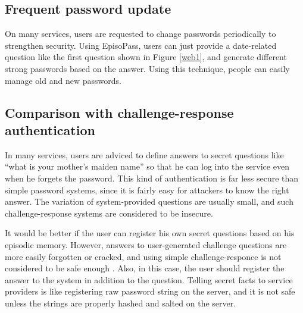 \documentclass{sigchi}
\begin{document}
\subsection{Frequent password update}

On many services, users are requested to change passwords periodically
to strengthen security.
%
%
Using EpisoPass, users can just provide a date-related question
like the first question shown in Figure \ref{web1},
and generate different strong passwords based on the answer.
Using this technique, people can easily manage old and new passwords.

\subsection{Comparison with challenge-response authentication}


In many services, users are adviced to define answers to secret questions like
``what is your mother's maiden name''
so that he can log into the service even when he forgets the password.
This kind of authentication is far less secure than simple password systems,
since it is fairly easy for attackers to know the right answer.
The variation of system-provided questions are usually small, and
such challenge-response systems are considered to be
insecure\cite{Rabkin:2008:PKQ:1408664.1408667}.

It would be better if the user can register his own secret questions
based on his episodic memory.
However, answers to user-generated challenge questions are more easily
forgotten or cracked,
and using simple challenge-responce is not considered to be safe enough
\cite{Just:2009:PCC:1572532.1572543}\cite{Schechter:2009:NSM:1607723.1608145}.
%
Also, in this case,
the user should register the answer to the system in addition to the question.
Telling secret facts to service providers is like
registering raw password string on the server,
and it is not safe unless the strings are properly hashed and salted on the server.
\end{document}
